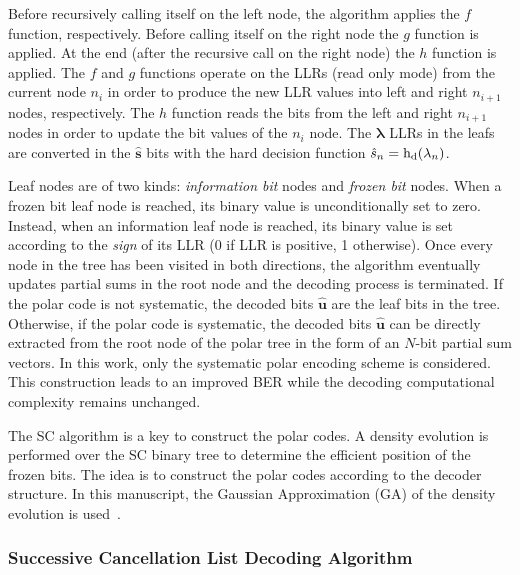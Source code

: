 Before recursively calling itself on the left node, the algorithm applies the
$f$ function, respectively. Before calling itself on the right node the $g$
function is applied. At the end (after the recursive call on the right node) the
$h$ function is applied. The $f$ and $g$ functions operate on the LLRs (read
only mode) from the current node $n_i$ in order to produce the new LLR values
into left and right $n_{i+1}$ nodes, respectively. The $h$ function reads the
bits from the left and right $n_{i+1}$ nodes in order to update the bit values
of the $n_i$ node. The $\bm{\lambda}$ LLRs in the leafs are converted in the
$\bm{\hat{s}}$ bits with the hard decision function $\hat{s}_n =
\operatorname{h_d}(\lambda_n)$.

Leaf nodes are of two kinds: \emph{information bit} nodes and \emph{frozen bit}
nodes. When a frozen bit leaf node is reached, its binary value is
unconditionally set to zero. Instead, when an information leaf node is reached,
its binary value is set according to the \emph{sign} of its LLR (0 if LLR is
positive, 1 otherwise). Once every node in the tree has been visited in both
directions, the algorithm eventually updates partial sums in the root node and
the decoding process is terminated. If the polar code is not systematic, the
decoded bits $\bm{\hat{u}}$ are the leaf bits in the tree. Otherwise, if the
polar code is systematic, the decoded bits $\bm{\hat{u}}$ can be directly
extracted from the root node of the polar tree in the form of an $N$-bit partial
sum vectors. In this work, only the systematic polar encoding scheme is
considered. This construction leads to an improved BER while the decoding
computational complexity remains unchanged.

The SC algorithm is a key to construct the polar codes. A density evolution
is performed over the SC binary tree to determine the efficient position of the
frozen bits. The idea is to construct the polar codes according to the decoder
structure. In this manuscript, the Gaussian Approximation (GA) of the density
evolution is used~\cite{Trifonov2012}.

\subsubsection{Successive Cancellation List Decoding Algorithm}

